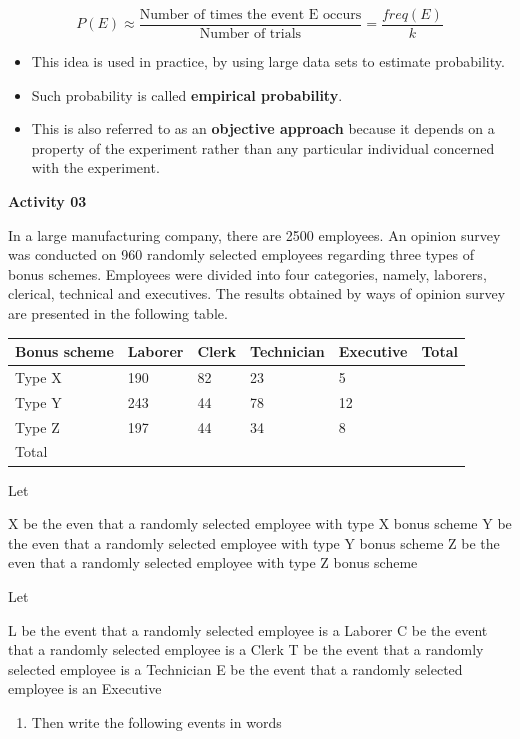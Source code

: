 \documentclass[]{book}
\providecommand{\tightlist}{%
  \setlength{\itemsep}{0pt}\setlength{\parskip}{0pt}}
\begin{document}
\[P(E) \approx \frac{\text{Number of times the event E occurs}}{\text{Number of trials}}= \frac{freq(E)}{k}\]

\begin{itemize}
\tightlist
\item
  This idea is used in practice, by using large data sets to estimate probability.
\item
  Such probability is called \textbf{empirical probability}.
\item
  This is also referred to as an \textbf{objective approach} because it depends on a property of the experiment rather than any particular individual concerned with the experiment.
\end{itemize}

\textbf{Activity 03}

In a large manufacturing company, there are 2500 employees. An opinion survey was conducted on 960 randomly selected employees regarding three types of bonus schemes. Employees were divided into four categories, namely, laborers, clerical, technical and executives. The results obtained by ways of opinion survey are presented in the following table.

\begin{longtable}[]{@{}llllll@{}}
\toprule
Bonus scheme & Laborer & Clerk & Technician & Executive & Total\tabularnewline
\midrule
\endhead
Type X & 190 & 82 & 23 & 5 &\tabularnewline
Type Y & 243 & 44 & 78 & 12 &\tabularnewline
Type Z & 197 & 44 & 34 & 8 &\tabularnewline
Total & & & & &\tabularnewline
\bottomrule
\end{longtable}

Let

X be the even that a randomly selected employee with type X bonus scheme
Y be the even that a randomly selected employee with type Y bonus scheme
Z be the even that a randomly selected employee with type Z bonus scheme

Let

L be the event that a randomly selected employee is a Laborer
C be the event that a randomly selected employee is a Clerk
T be the event that a randomly selected employee is a Technician
E be the event that a randomly selected employee is an Executive

\begin{enumerate}
\def\labelenumi{\Roman{enumi}.}
\tightlist
\item
  Then write the following events in words
\end{enumerate}
\end{document}
